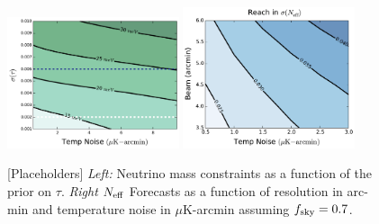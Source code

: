 \begin{figure}[t!]
\begin{center}
\includegraphics[width=0.45\textwidth]{figs/Mnu_tauprior.pdf}
\includegraphics[width=0.45\textwidth]{figs/Neff_space.pdf}
\caption{ [Placeholders] {\it Left:} Neutrino mass constraints as a function of the prior on $\tau$.  {\it Right} ${N_{\rm eff}}$ Forecasts as a function of resolution in arc-min and temperature noise in $\mu$K-arcmin assuming $f_{\rm sky} = 0.7$.}
\label{fig:Neff_future}
\end{center}
\end{figure}


